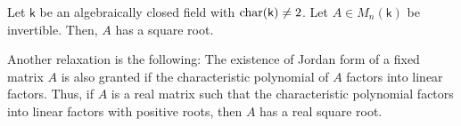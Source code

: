 \documentclass[12pt]{article}
\begin{document}
\begin{thm}
	Let $\mathsf{k}$ be an algebraically closed field with $\operatorname{char}(\mathsf{k}) \neq 2$. Let $A \in M_{n}(\mathsf{k})$ be invertible. Then, $A$ has a square root.
\end{thm}

Another relaxation is the following: The existence of Jordan form of a fixed matrix $A$ is also granted if the characteristic polynomial of $A$ factors into linear factors. Thus, if $A$ is a real matrix such that the characteristic polynomial factors into linear factors with positive roots, then $A$ has a real square root.
\end{document}
